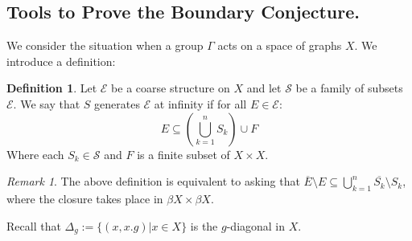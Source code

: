 \documentclass[11pt]{amsart}
\theoremstyle{plain}
\theoremstyle{definition}%
\newtheorem{definition}[theorem]{Definition}%
\theoremstyle{remark}%
\newtheorem{remark}[theorem]{Remark}%
\begin{document}
\subsection{Tools to Prove the Boundary Conjecture.}
We consider the situation when a group $\Gamma$ acts on a space of graphs $X$. We introduce a definition:

\begin{definition}
Let $\mathcal{E}$ be a coarse structure on $X$ and let $\mathcal{S}$ be a family of subsets $\mathcal{E}$. We say that $S$ generates $\mathcal{E}$ at infinity if for all $E \in \mathcal{E}$: 
\begin{equation*}
E \subseteq (\bigcup_{k=1}^{n}S_{k})\cup F
\end{equation*}
Where each $S_{k} \in \mathcal{S}$ and $F$ is a finite subset of $X \times X$.
\end{definition}

\begin{remark}
The above definition is equivalent to asking that $\overline{E}\setminus E \subseteq \bigcup_{k=1}^{n}\overline{S_{k}}\setminus S_{k}$, where the closure takes place in $\beta X \times \beta X$.
\end{remark}

Recall that $\Delta_{g}:= \lbrace (x,x.g)|x \in X \rbrace$ is the $g$-diagonal in $X$.
\end{document}
